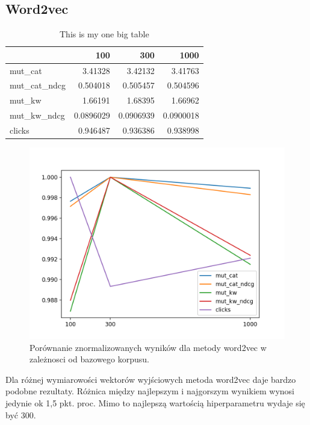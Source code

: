\documentclass[pl]{minipw} %
\begin{document}
\subsection{Word2vec}

\begin{table}
	\centering
	\begin{tabular}{lrrr}
		\hline
		&       100 &       300 &      1000 \\
		\hline
		mut\_cat      & 3.41328   & 3.42132   & 3.41763   \\
		mut\_cat\_ndcg & 0.504018  & 0.505457  & 0.504596  \\
		mut\_kw       & 1.66191   & 1.68395   & 1.66962   \\
		mut\_kw\_ndcg  & 0.0896029 & 0.0906939 & 0.0900018 \\
		clicks       & 0.946487  & 0.936386  & 0.938998  \\
		\hline
	\end{tabular}
	\caption{This is my one big table}
\end{table}

\begin{figure}[H]
	\centering
	\includegraphics[width=1\textwidth]{img/results/w2v_ctr.png}
	\caption{Porównanie znormalizowanych wyników dla metody word2vec w zależnosci od bazowego korpusu.}
\end{figure}

Dla różnej wymiarowości wektorów wyjściowych metoda word2vec daje bardzo podobne rezultaty. Różnica między najlepszym i najgorszym wynikiem wynosi jedynie ok 1,5 pkt. proc. Mimo to najlepszą wartością hiperparametru wydaje się być 300.
\end{document}
